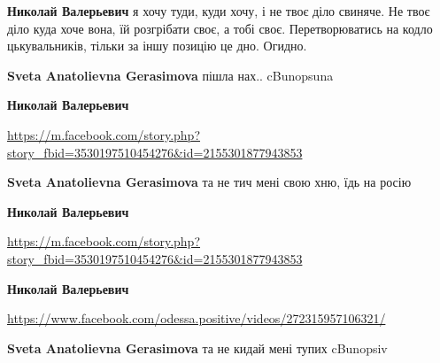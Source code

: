 \begin{itemize}
\begin{itemize}
\textbf{Николай Валерьевич} я хочу туди, куди хочу, і не твоє діло свиняче. Не твоє діло куда хоче вона, їй розгрібати своє, а тобі своє. Перетворюватись на кодло цькувальників, тільки за іншу позицію це дно. Огидно.


\textbf{Sveta Anatolievna Gerasimova} пішла нах.. cBunopsuna


\textbf{Николай Валерьевич} 

\url{https://m.facebook.com/story.php?story_fbid=3530197510454276&id=2155301877943853}


\textbf{Sveta Anatolievna Gerasimova} та не тич мені свою хню, їдь на росію


\textbf{Николай Валерьевич} 

\url{https://m.facebook.com/story.php?story_fbid=3530197510454276&id=2155301877943853}


\textbf{Николай Валерьевич} 

\url{https://www.facebook.com/odessa.positive/videos/272315957106321/}


\textbf{Sveta Anatolievna Gerasimova} та не кидай мені тупих cBunopsiv

\end{itemize}



\end{itemize}
